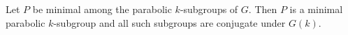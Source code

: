 Let $P$ be minimal among the parabolic $k$-subgroups of $G$. Then $P$ is a minimal parabolic $k$-subgroup and all such subgroups are conjugate under $G(k)$.
